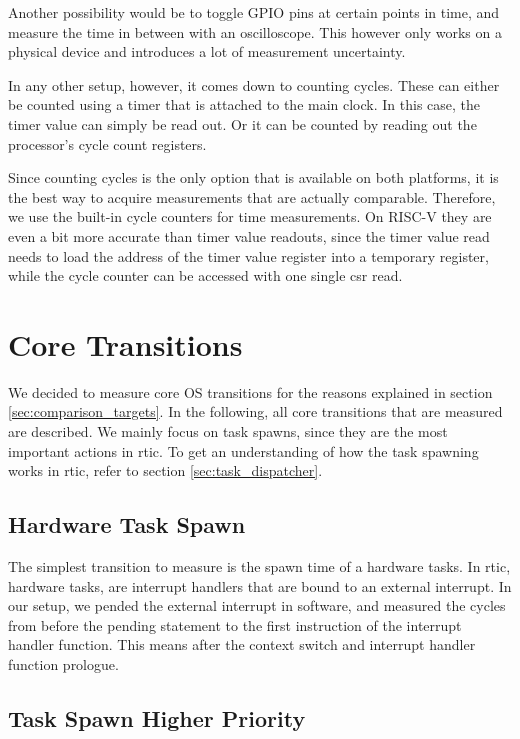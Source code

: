 Another possibility would be to toggle GPIO pins at certain points in time, and measure the time in between with an oscilloscope. This however only works on a physical device and introduces a lot of measurement uncertainty.

In any other setup, however, it comes down to counting cycles. These can either be counted using a timer that is attached to the main clock. In this case, the timer value can simply be read out. Or it can be counted by reading out the processor's cycle count registers. 

Since counting cycles is the only option that is available on both platforms, it is the best way to acquire measurements that are actually comparable. Therefore, we use the built-in cycle counters for time measurements. On RISC-V they are even a bit more accurate than timer value readouts, since the timer value read needs to load the address of the timer value register into a temporary register, while the cycle counter can be accessed with one single \gls{csr} read.

\section{Core Transitions}
\label{sec:core_transitions}

We decided to measure core OS transitions for the reasons explained in section \ref{sec:comparison_targets}. In the following, all core transitions that are measured are described. We mainly focus on task spawns, since they are the most important actions in \gls{rtic}. To get an understanding of how the task spawning works in \gls{rtic}, refer to section \ref{sec:task_dispatcher}.

\subsection{Hardware Task Spawn}

The simplest transition to measure is the spawn time of a hardware tasks. In \gls{rtic}, hardware tasks, are interrupt handlers that are bound to an external interrupt. In our setup, we pended the external interrupt in software, and measured the cycles from before the pending statement to the first instruction of the interrupt handler function. This means after the context switch and interrupt handler function prologue.

\subsection{Task Spawn Higher Priority}

